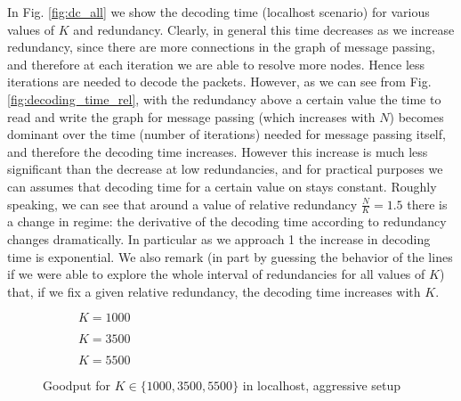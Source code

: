 In Fig. \ref{fig:dc_all} we show the decoding time (localhost scenario) for various values of $K$ and redundancy. Clearly, in general this time decreases as we increase redundancy, since there are more connections in the graph of message passing, and therefore at each iteration we are able to resolve more nodes. Hence less iterations are needed to decode the packets. However, as we can see from Fig.\ref{fig:decoding_time_rel}, with the redundancy above a certain value the time to read and write the graph for message passing (which increases with $N$) becomes dominant over the time (number of iterations) needed for message passing itself, and therefore the decoding time increases. However this increase is much less significant than the decrease at low redundancies, and for practical purposes we can assumes that decoding time for a certain value on stays constant. Roughly speaking, we can see that around a value of relative redundancy $\frac{N}{K}=1.5$ there is a change in regime: the derivative of the decoding time according to redundancy changes dramatically. In particular as we approach 1 the increase in decoding time is exponential. We also remark (in part by guessing the behavior of the lines if we were able to explore the whole interval of redundancies for all values of $K$) that, if we fix a given relative redundancy, the decoding time increases with $K$.\\

\begin{figure}[t!]
\centering
\begin{subfigure}{0.24\textwidth}
	\captionsetup{justification=centering,font=scriptsize}
	\centering
	\setlength\fwidth{\textwidth}
	\setlength{}
	
	\caption{$K=1000$}
	\label{fig:lh_good_1000}
\end{subfigure}\hspace{2em}%
\begin{subfigure}{0.23\textwidth}
	\captionsetup{justification=centering,font=scriptsize}
	\centering
	\setlength\fwidth{\textwidth}
	\setlength{}
	
	\caption{$K=3500$}
	\label{fig:lh_good_3500}
\end{subfigure}\hspace{2em}%
\begin{subfigure}{0.23\textwidth}
	\captionsetup{justification=centering,font=scriptsize}
	\centering
	\setlength\fwidth{\textwidth}
	\setlength{}
	
	\caption{$K=5500$}
	\label{fig:lh_good_5500}
\end{subfigure}
\caption{Goodput for $K \in \{1000, 3500, 5500\}$ in localhost, aggressive setup}
\label{fig:goodput_aggr}
\end{figure}

